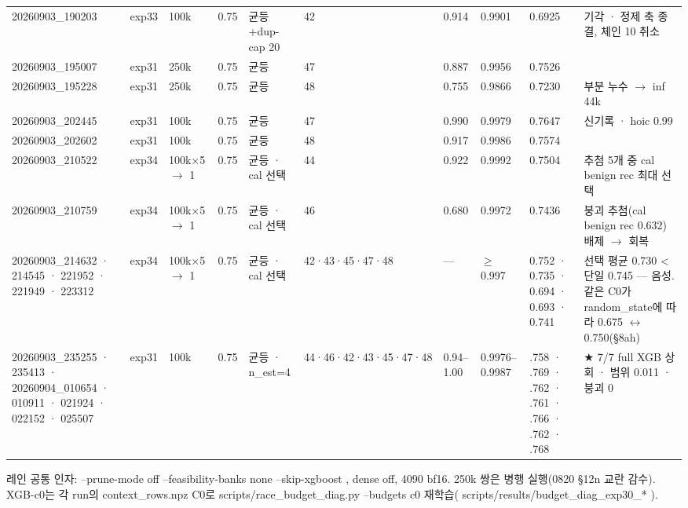 \begin{landscape}
\begin{longtable}
{}20260903\_\allowbreak{}190203 & exp33 & 100k & 0.75 & 균등+\allowbreak{}dup-cap 20 & 42 & 0.914 & 0.9901 & 0.6925 & 기각 · 정제 축 종결, 체인 10 취소 \\
{}20260903\_\allowbreak{}195007 & exp31 & 250k & 0.75 & 균등 & 47 & 0.887 & 0.9956 & 0.7526 &  \\
{}20260903\_\allowbreak{}195228 & exp31 & 250k & 0.75 & 균등 & 48 & 0.755 & 0.9866 & 0.7230 & 부분 누수  \ensuremath{\rightarrow} inf 44k \\
{}20260903\_\allowbreak{}202445 & exp31 & 100k & 0.75 & 균등 & 47 & 0.990 & 0.9979 & 0.7647 & 신기록 · hoic 0.99 \\
{}20260903\_\allowbreak{}202602 & exp31 & 100k & 0.75 & 균등 & 48 & 0.917 & 0.9986 & 0.7574 &  \\
{}20260903\_\allowbreak{}210522 & exp34 & 100k×5 \ensuremath{\rightarrow} 1 & 0.75 & 균등 · cal 선택 & 44 & 0.922 & 0.9992 & 0.7504 & 추첨 5개 중 cal benign rec 최대 선택 \\
{}20260903\_\allowbreak{}210759 & exp34 & 100k×5 \ensuremath{\rightarrow} 1 & 0.75 & 균등 · cal 선택 & 46 & 0.680 & 0.9972 & 0.7436 & 붕괴 추첨(cal benign rec 0.632) 배제  \ensuremath{\rightarrow}  회복 \\
{}20260903\_\allowbreak{}214632 · 214545 · 221952 · 221949 · 223312 & exp34 & 100k×5 \ensuremath{\rightarrow} 1 & 0.75 & 균등 · cal 선택 & 42·43·45·47·48 & — & \ensuremath{\geq}0.997 & 0.752 · 0.735 · 0.694 · 0.693 · 0.741 & 선택 평균 0.730 < 단일 0.745 — 음성. 같은 C0가 random\_\allowbreak{}state에 따라 0.675 \ensuremath{\leftrightarrow} 0.750(§8ah) \\
{}20260903\_\allowbreak{}235255 · 235413 · 20260904\_\allowbreak{}010654 · 010911 · 021924 · 022152 · 025507 & exp31 & 100k & 0.75 & 균등 · n\_\allowbreak{}est=\allowbreak{}4 & 44·46·42·43·45·47·48 & 0.94–1.00 & 0.9976–0.9987 & .758 · .769 · .762 · .761 · .766 · .762 · .768 & ★ 7/\allowbreak{}7 full XGB 상회 · 범위 0.011 · 붕괴 0 \\
\bottomrule
\end{longtable}
\endgroup
\end{landscape}
레인 공통 인자: --prune-mode off --feasibility-banks none --skip-xgboost , dense off, 4090 bf16. 250k 쌍은 병행 실행(0820 §12n 교란 감수). XGB-c0는 각 run의 context\_\allowbreak{}rows.npz C0로 scripts/\allowbreak{}race\_\allowbreak{}budget\_\allowbreak{}diag.py --budgets c0 재학습( scripts/\allowbreak{}results/\allowbreak{}budget\_\allowbreak{}diag\_\allowbreak{}exp30\_\allowbreak{}* ).

